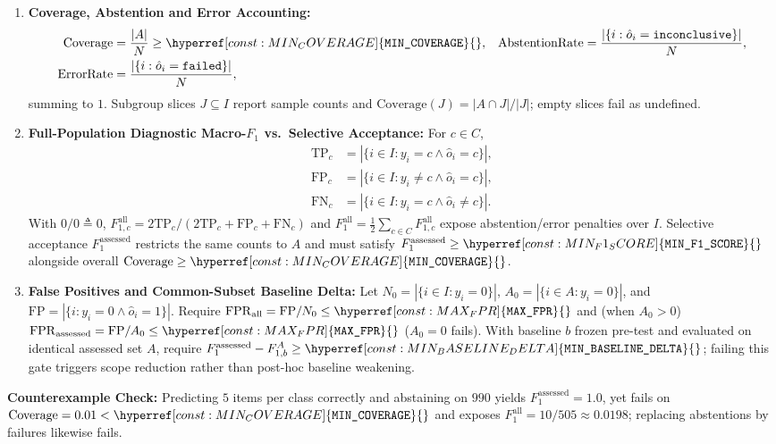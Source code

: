 \documentclass[11pt]{article}
\newcommand{\MinFOneScore}{\hyperref[const:MIN_F1_SCORE]{\texttt{MIN\_\allowbreak{}F1\_\allowbreak{}SCORE}}}
\newcommand{\MinCoverage}{\hyperref[const:MIN_COVERAGE]{\texttt{MIN\_\allowbreak{}COVERAGE}}}
\newcommand{\MaxFPR}{\hyperref[const:MAX_FPR]{\texttt{MAX\_\allowbreak{}FPR}}}
\newcommand{\MinBaselineDelta}{\hyperref[const:MIN_BASELINE_DELTA]{\texttt{MIN\_\allowbreak{}BASELINE\_\allowbreak{}DELTA}}}
\begin{document}
\begin{enumerate}[leftmargin=*]
    \item \textbf{Coverage, Abstention and Error Accounting:}
    \begin{align*}
    \text{Coverage}&=\frac{|A|}{N} \ge \MinCoverage{}, &
    \text{AbstentionRate}&=\frac{|\{i:\hat o_i=\texttt{inconclusive}\}|}{N}, \\
    \text{ErrorRate}&=\frac{|\{i:\hat o_i=\texttt{failed}\}|}{N},
    \end{align*}
    summing to $1$. Subgroup slices $J \subseteq I$ report sample counts and $\text{Coverage}(J)=|A\cap J|/|J|$; empty slices fail as undefined.
    \item \textbf{Full-Population Diagnostic Macro-$F_1$ vs.\ Selective Acceptance:} For $c\in C$,
    \begin{align*}
    \mathrm{TP}_c&=|\{i\in I:y_i=c\land\hat o_i=c\}|,\\
    \mathrm{FP}_c&=|\{i\in I:y_i\ne c\land\hat o_i=c\}|,\\
    \mathrm{FN}_c&=|\{i\in I:y_i=c\land\hat o_i\ne c\}|.
    \end{align*}
    With $0/0\triangleq0$, $F_{1,c}^{\mathrm{all}}=2\mathrm{TP}_c/(2\mathrm{TP}_c+\mathrm{FP}_c+\mathrm{FN}_c)$ and $F_1^{\mathrm{all}}=\tfrac12\sum_{c\in C}F_{1,c}^{\mathrm{all}}$ expose abstention/error penalties over $I$. Selective acceptance $F_1^{\mathrm{assessed}}$ restricts the same counts to $A$ and must satisfy $F_1^{\mathrm{assessed}}\ge\MinFOneScore{}$ alongside overall $\text{Coverage} \ge \MinCoverage{}$.
    \item \textbf{False Positives and Common-Subset Baseline Delta:} Let $N_0=|\{i\in I:y_i=0\}|$, $A_0=|\{i\in A:y_i=0\}|$, and $\mathrm{FP}=|\{i:y_i=0\land\hat o_i=1\}|$. Require $\mathrm{FPR}_{\mathrm{all}}=\mathrm{FP}/N_0 \le \MaxFPR{}$ and (when $A_0 > 0$) $\mathrm{FPR}_{\mathrm{assessed}}=\mathrm{FP}/A_0\le\MaxFPR{}$ ($A_0=0$ fails). With baseline $b$ frozen pre-test and evaluated on identical assessed set $A$, require $F_1^{\mathrm{assessed}}-F_{1,b}^{A}\ge\MinBaselineDelta{}$; failing this gate triggers scope reduction rather than post-hoc baseline weakening.
\end{enumerate}

\noindent\textbf{Counterexample Check:} Predicting $5$ items per class correctly and abstaining on $990$ yields $F_1^{\mathrm{assessed}} = 1.0$, yet fails on $\text{Coverage} = 0.01 < \MinCoverage{}$ and exposes $F_1^{\mathrm{all}} = 10/505 \approx 0.0198$; replacing abstentions by failures likewise fails.
\end{document}
